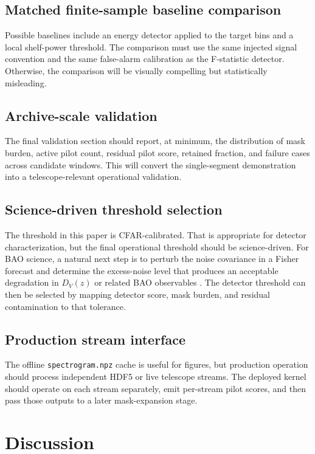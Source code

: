 \documentclass[10pt,letterpaper]{article}
\begin{document}
\subsection{Matched finite-sample baseline comparison}

Possible baselines include an energy detector applied to the target bins and a local shelf-power threshold. The comparison must use the same injected signal convention and the same false-alarm calibration as the F-statistic detector. Otherwise, the comparison will be visually compelling but statistically misleading.

\subsection{Archive-scale validation}

The final validation section should report, at minimum, the distribution of mask burden, active pilot count, residual pilot score, retained fraction, and failure cases across candidate windows. This will convert the single-segment demonstration into a telescope-relevant operational validation.

\subsection{Science-driven threshold selection}

The threshold in this paper is CFAR-calibrated. That is appropriate for detector characterization, but the final operational threshold should be science-driven. For BAO science, a natural next step is to perturb the noise covariance in a Fisher forecast and determine the excess-noise level that produces an acceptable degradation in $D_V(z)$ or related BAO observables \cite{Bull2015,RadioFisher2021}. The detector threshold can then be selected by mapping detector score, mask burden, and residual contamination to that tolerance.

\subsection{Production stream interface}

The offline \texttt{spectrogram.npz} cache is useful for figures, but production operation should process independent HDF5 or live telescope streams. The deployed kernel should operate on each stream separately, emit per-stream pilot scores, and then pass those outputs to a later mask-expansion stage.

\section{Discussion}
\label{sec:discussion}
\end{document}
